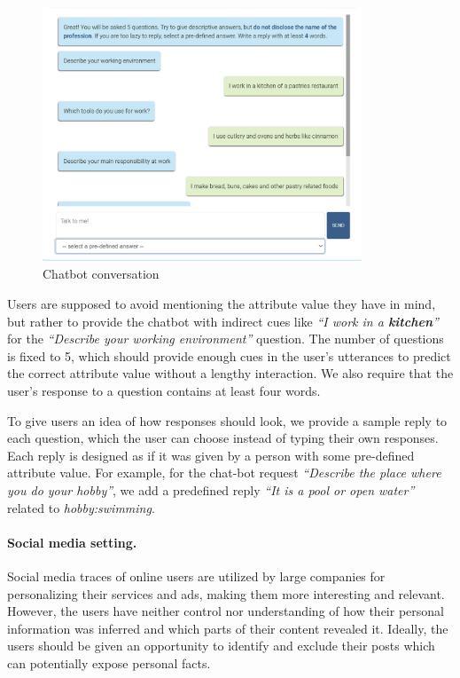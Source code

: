 \begin{figure}[th!]
\centering
\includegraphics[width=0.85\textwidth]{imgs/conv-baker.png}
\vspace*{-0.3cm}
\caption[Chatbot conversation in CHARM demonstration platform.]{Chatbot conversation}
\label{conv}
\end{figure}

Users are supposed to avoid mentioning the attribute value they have in mind, but rather to provide the chatbot with indirect cues like \emph{``I work in a \textbf{kitchen}''} for the \emph{``Describe your working environment''} question. The number of questions is fixed to 5, which should provide enough cues in the user's utterances to predict the correct attribute value without a lengthy interaction. We also require that the user's response to a question contains at least four words. 

To give users an idea of how responses should look, we provide a sample reply to each question, which the user can choose instead of typing their own responses. Each reply is designed as if it was given by a person with some pre-defined attribute value. For example, for the chat-bot request \textit{``Describe the place where you do your hobby''}, we add a predefined reply \textit{``It is a pool or open water''} related to \textit{hobby:swimming}. 

\paragraph{Social media setting.} 
Social media traces of online users are utilized by large companies for personalizing their services and ads, making them more interesting and relevant. However, the users have neither control nor understanding of how their personal information was inferred and which parts of their content revealed it. Ideally, the users should be given an opportunity to identify and exclude their posts which can potentially expose personal facts. 

